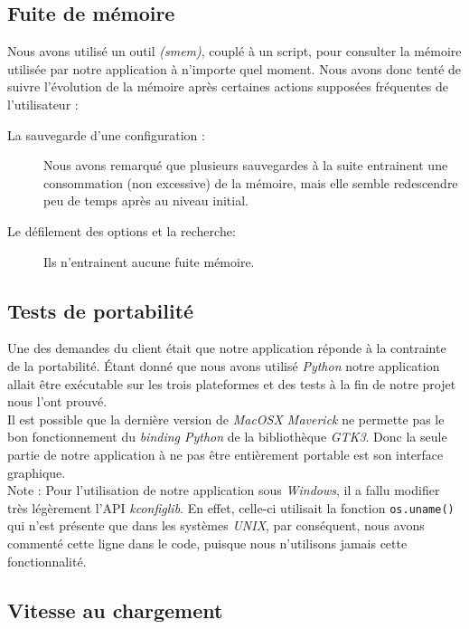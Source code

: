 ﻿\documentclass[17pts]{report}
\begin{document}
\subsection{Fuite de mémoire}
\label{sub:Fuite de mémoire}
Nous avons utilisé un outil \textit{(smem)}, couplé à un script, pour consulter
la mémoire utilisée par notre application à n'importe quel moment. Nous avons
donc tenté de suivre l'évolution de la mémoire après certaines actions
supposées fréquentes de l'utilisateur :

\begin{description}
    \item[La sauvegarde d'une configuration :] Nous avons remarqué que
        plusieurs sauvegardes à la suite entrainent une consommation (non
        excessive) de la mémoire, mais elle semble redescendre peu de temps
        après au niveau initial.
    \item[Le défilement des options et la recherche:] Ils n'entrainent aucune
        fuite mémoire.
\end{description}

\subsection{Tests de portabilité}
\label{sub:Tests de portabilité}

Une des demandes du client était que notre application réponde à la contrainte
de la portabilité. Étant donné que nous avons utilisé \textit{Python} notre
application allait être exécutable sur les trois plateformes et des tests à la
fin de notre projet nous l'ont prouvé.\\
Il est possible que la dernière version de \textit{MacOSX Maverick} ne permette
pas le bon fonctionnement du \textit{binding Python} de la bibliothèque
\textit{GTK3}. Donc la seule partie de notre application à ne pas être
entièrement portable est son interface graphique.\\

Note : Pour l'utilisation de notre application sous \textit{Windows}, il a fallu
modifier très légèrement l'API \textit{kconfiglib}. En effet, celle-ci
utilisait la fonction \verb|os.uname()| qui n'est présente que dans les
systèmes \textit{UNIX}, par conséquent, nous avons commenté cette ligne dans le
code, puisque nous n'utilisons jamais cette fonctionnalité.

\subsection{Vitesse au chargement}
\label{sub:Vitesse au chargement}
\end{document}
